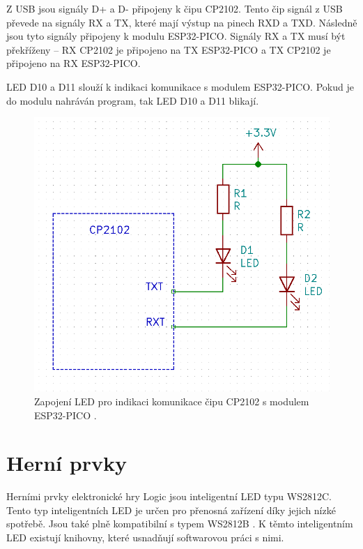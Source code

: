   Z USB jsou signály D+ a D- připojeny k čipu CP2102. Tento čip signál z USB převede na signály RX a TX, které mají výstup 
  na pinech RXD a TXD. Následně jsou tyto signály připojeny k modulu ESP32-PICO. Signály RX a TX musí být překříženy – RX 
  CP2102 je připojeno na TX ESP32-PICO a TX CP2102 je připojeno na RX ESP32-PICO. 

  LED D10 a D11 slouží k indikaci komunikace s modulem ESP32-PICO. Pokud je do modulu nahráván program, tak LED D10 a D11 blikají.

  \begin{figure}[!h]
      \begin{center}
        \includegraphics[scale=0.5]{obrazky/CP2102_LED.png}
      \end{center}
      \caption[Zapojení LED pro indikaci komunikace čipu CP2102 s modulem ESP32-PICO]{Zapojení LED pro indikaci komunikace čipu 
      CP2102 s modulem ESP32-PICO \cite{CP2102_datasheet}.}
  \end{figure}

  \section{Herní prvky}
  Herními prvky elektronické hry Logic jsou inteligentní LED typu WS2812C. Tento typ inteligentních LED je určen pro přenosná 
  zařízení díky jejich nízké spotřebě. Jsou také plně kompatibilní s typem WS2812B \cite{WS2812C_datasheet}. K těmto inteligentním LED 
  existují knihovny, které usnadňují softwarovou práci s nimi.

